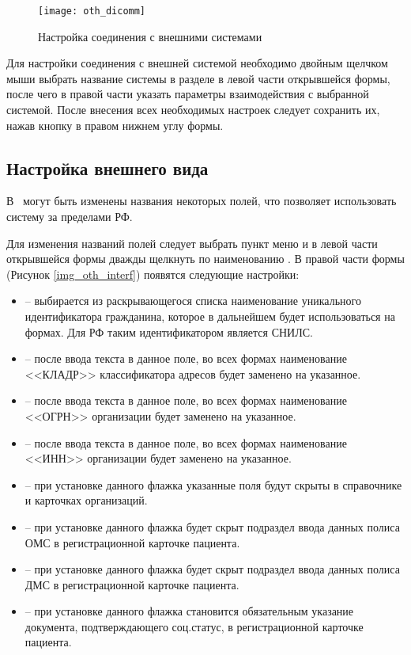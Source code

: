 \begin{figure}[ht]\centering
 \texttt{[image: oth\_dicomm]}
 \caption{Настройка соединения с внешними системами}
 \label{img_oth_dicomm}
\end{figure}

Для настройки соединения с внешней системой необходимо двойным щелчком мыши выбрать название системы в разделе  в левой части открывшейся формы, после чего в правой части указать параметры взаимодействия с выбранной системой. После внесения всех необходимых настроек следует сохранить их, нажав кнопку  в правом нижнем углу формы.

\subsection{Настройка внешнего вида}

В \tmis~могут быть изменены названия некоторых полей, что позволяет использовать систему за пределами РФ.

Для изменения названий полей следует выбрать пункт меню  и в левой части открывшейся формы дважды щелкнуть по наименованию . В правой части формы (Рисунок \ref{img_oth_interf}) появятся следующие настройки:
\begin{itemize}
 \item {} -- выбирается из раскрывающегося списка наименование уникального идентификатора гражданина, которое в дальнейшем будет использоваться на формах. Для РФ таким идентификатором является СНИЛС.
 \item {} -- после ввода текста в данное поле, во всех формах наименование <<КЛАДР>> классификатора адресов будет заменено на указанное.
 \item {} -- после ввода текста в данное поле, во всех формах наименование <<ОГРН>> организации будет заменено на указанное.
 \item {} -- после ввода текста в данное поле, во всех формах наименование <<ИНН>> организации будет заменено на указанное.
 \item {} -- при установке данного флажка указанные поля будут скрыты в справочнике и карточках организаций.
 \item {} -- при установке данного флажка будет скрыт подраздел ввода данных полиса ОМС в регистрационной карточке пациента.
 \item {} -- при установке данного флажка будет скрыт подраздел ввода данных полиса ДМС в регистрационной карточке пациента.
 \item {} -- при установке данного флажка становится обязательным указание документа, подтверждающего соц.статус, в регистрационной карточке пациента.
\end{itemize} 

